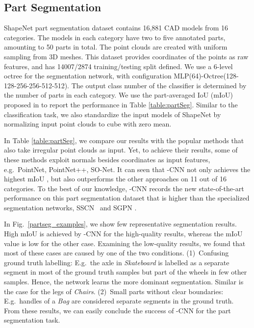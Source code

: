 \documentclass[10pt,twocolumn,letterpaper]{article}
\begin{document}
{\subsection{Part Segmentation}
ShapeNet part segmentation dataset \cite{yi2016scalable} contains 16,881  CAD models from 16 categories. The models in each category have two to five annotated parts, amounting to 50 parts in total. The point clouds are created with uniform sampling from 3D meshes.
This dataset provides   coordinates of the points as raw features, and has 14007/2874 training/testing split defined. 
We  use a 6-level octree for the segmentation network, with configuration MLP(64)-Octree(128-128-256-256-512-512). The output class number  of the classifier is determined by the number of parts in each category.
We use the part-averaged IoU (mIoU)  proposed in \cite{qi2017pointnet} to report the performance in Table \ref{table:partSeg}. Similar to the classification task, we also standardize the input models of ShapeNet by normalizing input point
clouds to   cube with zero mean.


In Table \ref{table:partSeg}, we compare our results with the popular methods that also take irregular point clouds as  input. Yet, to achieve their results, some of these methods exploit  normals besides  coordinates as input features, e.g.~PointNet, PointNet++, SO-Net. 
It can seen that -CNN not only achieves the highest mIoU , but also outperforms the other approaches on 11 out of 16 categories.
To the best of our knowledge, -CNN records the new state-of-the-art performance on this part segmentation dataset that is  higher than 
the specialized segmentation networks, SSCN~\cite{graham20183d} and SGPN \cite{wang2018sgpn}.



In Fig.~\ref{partseg_examples}, we show few representative segmentation results. High mIoU is achieved by -CNN for the high-quality results, whereas the mIoU value is low for the other case.  Examining the low-quality results, we found that most of these cases are caused by one of the two conditions. (1)~Confusing ground truth labelling: E.g.~the axle in \textit{Skateboard} is labelled as a separate  segment in most of the ground truth samples but part of the wheels in few other samples. Hence, the network learns the more dominant segmentation. Similar is the case for the legs of \textit{Chairs}. (2)~Small parts without clear boundaries: E.g.~handles of a \textit{Bag} are considered separate segments in the ground truth.  From these results, we can easily conclude the success of -CNN for the part segmentation task.




}
\end{document}
